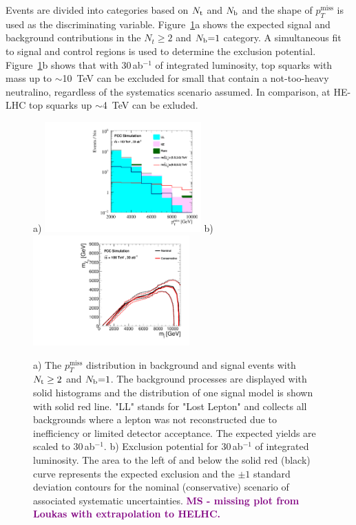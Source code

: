 \documentclass[11pt,twoside,a4paper]{cernrep}
\newcommand{\MS}[1]{\textbf{\textcolor{purple}{MS - #1}}}
\begin{document}
Events are divided into categories based on $N_{\rm t}$ and $N_{\rm b}$ and the shape of $p_T^{\mathrm{miss}}$ is used as the discriminating variable. Figure~\ref{stops}a shows the expected signal and background contributions in the $N_t \geq 2$ and $N_{\rm b}{=}1$ category. A simultaneous fit to signal and control regions is used to determine the exclusion potential. Figure~\ref{stops}b shows that with 30\,ab$^{-1}$ of integrated luminosity, top squarks with mass up to $\sim$10~TeV can be excluded for small that contain a not-too-heavy neutralino, regardless of the systematics scenario assumed. In comparison, at HE-LHC top squarks up $\sim$4~TeV can be exluded.
%
%
%
\begin{figure}
  \centering
  a)
  \includegraphics[width=6cm]{sr_1.pdf}
  b)
  \includegraphics[width=6cm]{lim_30ab_comb.pdf}
  \caption{a) The $p_T^{\mathrm{miss}}$ distribution in background and signal events with $N_{\rm t} \geq 2$ and $N_{\rm b}{=}1$. The background processes are displayed with solid histograms and the distribution of one signal model is shown with solid red line. "LL" stands for "Lost Lepton" and collects all backgrounds where a lepton was not reconstructed due to inefficiency or limited detector acceptance. The expected yields are scaled to 30\,ab$^{-1}$. b) Exclusion potential for 30\,ab$^{-1}$ of integrated luminosity. The area to the left of and below the solid red (black) curve represents the expected exclusion and the $\pm1$ standard deviation contours for the nominal (conservative) scenario of associated systematic uncertainties. \MS{missing plot from Loukas with extrapolation to HELHC.} }
  \label{stops}
\end{figure}
\end{document}
